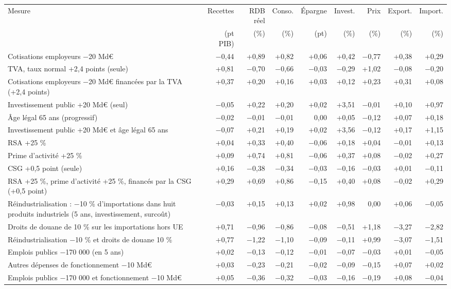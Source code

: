 \begin{tabular}{p{5.0cm}rrrrrrrr}
\toprule
Mesure & Recettes & RDB réel & Conso. & Épargne & Invest. & Prix & Export. & Import. \\
 & (pt PIB) & (\%) & (\%) & (pt) & (\%) & (\%) & (\%) & (\%) \\
\midrule
Cotisations employeurs −20 Md€ & $-$0{,}44 & +0{,}89 & +0{,}82 & +0{,}06 & +0{,}42 & $-$0{,}77 & +0{,}38 & +0{,}29 \\
TVA, taux normal +2,4 points (seule) & +0{,}81 & $-$0{,}70 & $-$0{,}66 & $-$0{,}03 & $-$0{,}29 & +1{,}02 & $-$0{,}08 & $-$0{,}20 \\
Cotisations employeurs −20 Md€ financées par la TVA (+2,4 points) & +0{,}37 & +0{,}20 & +0{,}16 & +0{,}03 & +0{,}12 & +0{,}23 & +0{,}31 & +0{,}08 \\
Investissement public +20 Md€ (seul) & $-$0{,}05 & +0{,}22 & +0{,}20 & +0{,}02 & +3{,}51 & $-$0{,}01 & +0{,}10 & +0{,}97 \\
Âge légal 65 ans (progressif) & $-$0{,}02 & $-$0{,}01 & $-$0{,}01 & 0{,}00 & +0{,}05 & $-$0{,}12 & +0{,}07 & +0{,}18 \\
Investissement public +20 Md€ et âge légal 65 ans & $-$0{,}07 & +0{,}21 & +0{,}19 & +0{,}02 & +3{,}56 & $-$0{,}12 & +0{,}17 & +1{,}15 \\
RSA +25 \% & +0{,}04 & +0{,}33 & +0{,}40 & $-$0{,}06 & +0{,}18 & +0{,}04 & $-$0{,}01 & +0{,}13 \\
Prime d'activité +25 \% & +0{,}09 & +0{,}74 & +0{,}81 & $-$0{,}06 & +0{,}37 & +0{,}08 & $-$0{,}02 & +0{,}27 \\
CSG +0,5 point (seule) & +0{,}16 & $-$0{,}38 & $-$0{,}34 & $-$0{,}03 & $-$0{,}16 & $-$0{,}03 & +0{,}01 & $-$0{,}11 \\
RSA +25 \%, prime d'activité +25 \%, financés par la CSG (+0,5 point) & +0{,}29 & +0{,}69 & +0{,}86 & $-$0{,}15 & +0{,}40 & +0{,}08 & $-$0{,}02 & +0{,}29 \\
Réindustrialisation : −10 \% d'importations dans huit produits industriels (5 ans, investissement, surcoût) & $-$0{,}03 & +0{,}15 & +0{,}13 & +0{,}02 & +0{,}98 & 0{,}00 & +0{,}06 & $-$0{,}05 \\
Droits de douane de 10 \% sur les importations hors UE & +0{,}71 & $-$0{,}96 & $-$0{,}86 & $-$0{,}08 & $-$0{,}51 & +1{,}18 & $-$3{,}27 & $-$2{,}82 \\
Réindustrialisation −10 \% et droits de douane 10 \% & +0{,}77 & $-$1{,}22 & $-$1{,}10 & $-$0{,}09 & $-$0{,}11 & +0{,}99 & $-$3{,}07 & $-$1{,}51 \\
Emplois publics −170 000 (en 5 ans) & +0{,}02 & $-$0{,}13 & $-$0{,}12 & $-$0{,}01 & $-$0{,}07 & $-$0{,}03 & +0{,}01 & $-$0{,}05 \\
Autres dépenses de fonctionnement −10 Md€ & +0{,}03 & $-$0{,}23 & $-$0{,}21 & $-$0{,}02 & $-$0{,}09 & $-$0{,}15 & +0{,}07 & +0{,}02 \\
Emplois publics −170 000 et fonctionnement −10 Md€ & +0{,}05 & $-$0{,}36 & $-$0{,}32 & $-$0{,}03 & $-$0{,}16 & $-$0{,}19 & +0{,}08 & $-$0{,}04 \\
\bottomrule
\end{tabular}
